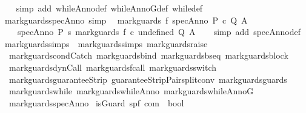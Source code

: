 \begin{isabellebody}
%
\isadelimproof
\ \ %
\endisadelimproof
%
\isatagproof
{}\isamarkupfalse%
\ {\isacharparenleft}simp\ add{\isacharcolon}\ whileAnno{\isacharunderscore}def\ whileAnnoG{\isacharunderscore}def\ while{\isacharunderscore}def{\isacharparenright}%
\endisatagproof
{\isafoldproof}%
%
\isadelimproof
\ \isanewline
%
\endisadelimproof
\isanewline
{}\isamarkupfalse%
\ mark{\isacharunderscore}guards{\isacharunderscore}specAnno\ {\isacharbrackleft}simp{\isacharbrackright}{\isacharcolon}\isanewline
\ \ {\isachardoublequoteopen}mark{\isacharunderscore}guards\ f\ {\isacharparenleft}specAnno\ P\ c\ Q\ A{\isacharparenright}\ {\isacharequal}\ \isanewline
\ \ \ \ specAnno\ P\ {\isacharparenleft}{\isasymlambda}s{\isachardot}\ mark{\isacharunderscore}guards\ f\ {\isacharparenleft}c\ undefined{\isacharparenright}{\isacharparenright}\ Q\ A{\isachardoublequoteclose}\isanewline
%
\isadelimproof
\ \ %
\endisadelimproof
%
\isatagproof
{}\isamarkupfalse%
\ {\isacharparenleft}simp\ add{\isacharcolon}\ specAnno{\isacharunderscore}def{\isacharparenright}%
\endisatagproof
{\isafoldproof}%
%
\isadelimproof
\isanewline
%
\endisadelimproof
\isanewline
{}\isamarkupfalse%
\ mark{\isacharunderscore}guards{\isacharunderscore}simps\ {\isacharequal}\ mark{\isacharunderscore}guards{\isachardot}simps\ mark{\isacharunderscore}guards{\isacharunderscore}raise\ \isanewline
\ \ mark{\isacharunderscore}guards{\isacharunderscore}condCatch\ mark{\isacharunderscore}guards{\isacharunderscore}bind\ mark{\isacharunderscore}guards{\isacharunderscore}bseq\ mark{\isacharunderscore}guards{\isacharunderscore}block\isanewline
\ \ mark{\isacharunderscore}guards{\isacharunderscore}dynCall\ mark{\isacharunderscore}guards{\isacharunderscore}fcall\ mark{\isacharunderscore}guards{\isacharunderscore}switch\ \isanewline
\ \ mark{\isacharunderscore}guards{\isacharunderscore}guaranteeStrip\ guaranteeStripPair{\isacharunderscore}split{\isacharunderscore}conv\ mark{\isacharunderscore}guards{\isacharunderscore}guards\isanewline
\ \ mark{\isacharunderscore}guards{\isacharunderscore}while\ mark{\isacharunderscore}guards{\isacharunderscore}whileAnno\ mark{\isacharunderscore}guards{\isacharunderscore}whileAnnoG\isanewline
\ \ mark{\isacharunderscore}guards{\isacharunderscore}specAnno\isanewline
\isanewline
{}\isamarkupfalse%
\ is{\isacharunderscore}Guard{\isacharcolon}{\isacharcolon}\ {\isachardoublequoteopen}{\isacharparenleft}{\isacharprime}s{\isacharcomma}{\isacharprime}p{\isacharcomma}{\isacharprime}f{\isacharparenright}\ com\ {\isasymRightarrow}\ bool{\isachardoublequoteclose}\isanewline

\end{isabellebody}
